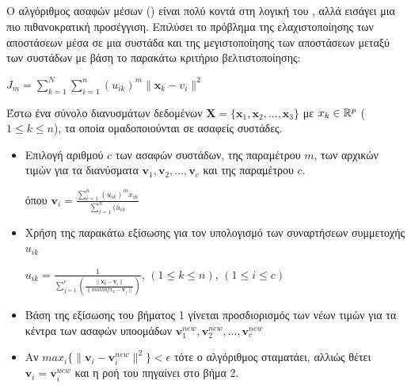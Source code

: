 \subsection{}
Ο αλγόριθμος ασαφών  μέσων () είναι πολύ κοντά στη λογική του , αλλά εισάγει μια πιο πιθανοκρατική προσέγγιση. Επιλύσει το πρόβλημα της ελαχιστοποίησης των αποστάσεων μέσα σε μια συστάδα και της μεγιστοποίησης των αποστάσεων μεταξύ των συστάδων με βάση το παρακάτω κριτήριο βελτιστοποίησης\cite{fuzzyclustering}:
\begin{center}
$J_m = \sum_{k=1}^N\sum_{i=1}^n(u_{ik})^m\|\mathbf{x}_k-v_i\|^2$
\end{center} 
Έστω ένα σύνολο διανυσμάτων δεδομένων $\mathbf{X}=\{\mathbf{x}_1, \mathbf{x}_2, ..., \mathbf{x}_3\}$ με $x_k \in \mathbb{R}^p$ ($1 \leq k \leq n$), τα οποία ομαδοποιούνται σε ασαφείς συστάδες.
\begin{itemize}
\item Επιλογή αριθμού $c$ των ασαφών συστάδων, της παραμέτρου $m$, των αρχικών τιμών για τα διανύσματα  $\mathbf{v}_1, \mathbf{v}_2, ...,\mathbf{v}_c$ και της παραμέτρου $c$.
\begin{center}
όπου $\mathbf{v}_i=\frac{\sum_{i=1}^n(u_{ik})^mx_{ik}}{\sum_{i=1}^n(u_{ik}}$
\end{center}
\item Χρήση της παρακάτω εξίσωσης για τον υπολογισμό των συναρτήσεων συμμετοχής $u_{ik}$
\begin{center}
$u_{ik}=\frac{1}{\sum_{j=1}^c (\frac{\|\mathbf{x}_k-\mathbf{v}_i\|}{\|mathbf{x}_k-\mathbf{v}_j\|})}$, $(1 \leq k \leq n)$, $(1 \leq i \leq c)$
\end{center}
\item Βάση της εξίσωσης του βήματος 1 γίνεται προσδιορισμός των νέων τιμών για τα κέντρα των ασαφών υποομάδων $\mathbf{v}_1^{new}, \mathbf{v}_2^{new}, ...,\mathbf{v}_c^{new}$
\item Αν $max_i\{\|\mathbf{v}_i-\mathbf{v}_i^{new}\|^2\}<\epsilon$ τότε ο αλγόριθμος σταματάει, αλλιώς θέτει $\mathbf{v}_i=\mathbf{v}_i^{new}$ και η ροή του πηγαίνει στο βήμα 2.

\end{itemize}
